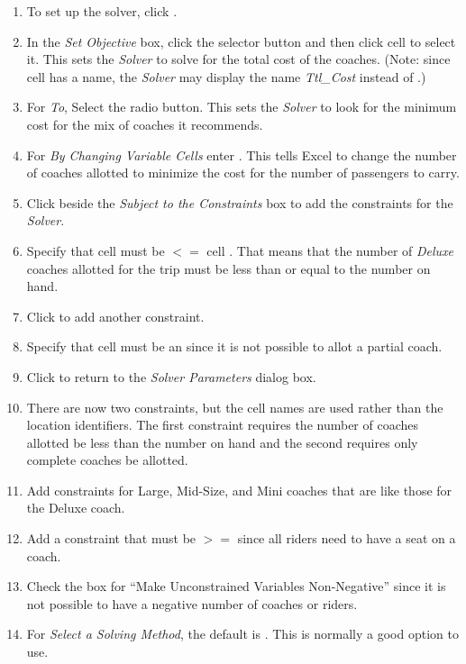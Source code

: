 \begin{enumerate}[resume]
	\item To set up the solver, click .
	\item In the \textit{Set Objective} box, click the selector button and then click cell  to select it. This sets the \textit{Solver} to solve for the total cost of the coaches. (Note: since cell  has a name, the \textit{Solver}  may display the name \textit{Ttl\_Cost} instead of .)
	\item For \textit{To}, Select the  radio button. This sets the \textit{Solver} to look for the minimum cost for the mix of coaches it recommends.
	\item For \textit{By Changing Variable Cells} enter . This tells Excel to change the number of coaches allotted to minimize the cost for the number of passengers to carry.
	\item Click  beside the \textit{Subject to the Constraints} box to add the constraints for the \textit{Solver}.
	\item Specify that cell  must be $ <= $ cell . That means that the number of \textit{Deluxe} coaches allotted for the trip must be less than or equal to the number on hand.
	\item Click  to add another constraint.
	\item Specify that cell  must be an  since it is not possible to allot a partial coach.
	\item Click  to return to the \textit{Solver Parameters} dialog box. 
	\item There are now two constraints, but the cell names are used rather than the location identifiers. The first constraint requires the number of coaches allotted be less than the number on hand and the second requires only complete coaches be allotted.
	\item Add constraints for Large, Mid-Size, and Mini coaches that are like those for the Deluxe coach.
	\item Add a constraint that  must be $ >= $  since all riders need to have a seat on a coach.
	\item Check the box for ``Make Unconstrained Variables Non-Negative'' since it is not possible to have a negative number of coaches or riders.
	 \item For \textit{Select a Solving Method}, the default is . This is normally a good option to use.
	 
\end{enumerate}

